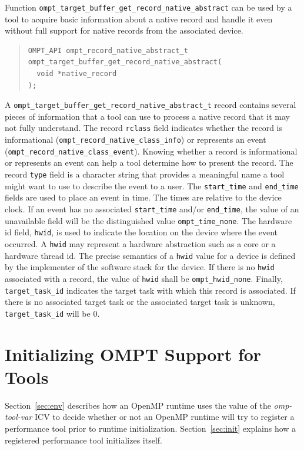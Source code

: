 \documentclass{article}
\begin{document}
Function  \verb|ompt_target_buffer_get_record_native_abstract| can be used by a tool to acquire basic information about a native record and handle it even without full support for  native records from the associated device.
\begin{quote}
\begin{verbatim}
OMPT_API ompt_record_native_abstract_t ompt_target_buffer_get_record_native_abstract(
  void *native_record 
);

\end{verbatim}
\end{quote}
A  \verb|ompt_target_buffer_get_record_native_abstract_t| record contains several pieces of information that a tool can use to process a native record that it may not fully understand. The record \verb|rclass| field indicates whether the record is informational (\verb|ompt_record_native_class_info|) or represents an event (\verb|ompt_record_native_class_event|). Knowing whether a record is informational or represents an event can help a tool determine how to present the record. The record  \verb|type| field is a character string that provides  a meaningful name  a tool might want to use to describe the event to a user. The \verb|start_time| and \verb|end_time| fields are used to place an event in time. The times are relative to the device clock. If an event has no associated \verb|start_time| and/or \verb|end_time|, the value of an unavailable field will be the distinguished value \verb|ompt_time_none|. The hardware id field, \verb|hwid|,  is used to indicate the location on the device where the event occurred. A \verb|hwid| may represent a hardware abstraction such as a core or a hardware thread id. The precise semantics of a \verb|hwid| value for a device is defined by the implementer of the software stack for the device. If there is no \verb|hwid| associated with a record, the value of \verb|hwid| shall be \verb|ompt_hwid_none|. Finally, \verb|target_task_id| indicates the target task with which this record is associated. If there is no associated target task or the associated target task is unknown,  \verb|target_task_id|  will be  0.

\section{Initializing OMPT Support for Tools}
\label{sec:enabling}

Section~\ref{sec:env} describes how an OpenMP runtime uses the value of the {\em omp-tool-var} ICV to decide whether or not an OpenMP runtime will try to register a performance tool prior to runtime initialization.
Section~\ref{sec:init} explains how a registered performance tool initializes itself.
\end{document}
